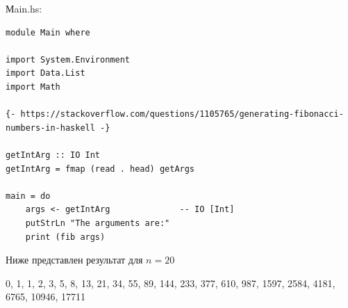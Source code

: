 \documentclass[12pt, leqno]{article}
\begin{document}
Мain.hs:
\begin{verbatim}
module Main where

import System.Environment   
import Data.List  
import Math

{- https://stackoverflow.com/questions/1105765/generating-fibonacci-numbers-in-haskell -}

getIntArg :: IO Int
getIntArg = fmap (read . head) getArgs

main = do  
    args <- getIntArg              -- IO [Int]
    putStrLn "The arguments are:"  
    print (fib args)
\end{verbatim} 

\clearpage 
Ниже представлен результат для $ n = 20$


0, 1, 1, 2, 3, 5, 8, 13, 21, 34, 55, 89, 144, 233, 377, 610, 987, 1597, 2584, 4181, 6765, 10946, 17711

 

  
\end{document}
